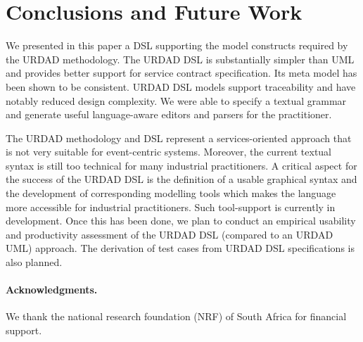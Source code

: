 \section{Conclusions and Future Work \label{sec:conclusionsAndOutlook}}

We presented in this paper a DSL supporting the model constructs required by the URDAD methodology. The URDAD DSL is substantially simpler than UML and provides better support for service contract specification. Its meta model has been shown to be consistent. URDAD DSL models support traceability and have notably reduced design complexity. We were able to specify a textual grammar and generate useful language-aware editors and parsers for the practitioner.

The URDAD methodology and DSL represent a services-oriented approach that is not very suitable for event-centric systems. Moreover, the current textual syntax is still too technical for many industrial practitioners. A critical aspect for the success of the URDAD DSL is the definition of a usable graphical syntax and the development of corresponding modelling tools which makes the language more accessible for industrial practitioners. Such tool-support is currently in development. Once this has been done, we plan to conduct an empirical usability and productivity assessment of the URDAD DSL (compared to an URDAD UML) approach. The derivation of test cases from URDAD DSL specifications is also planned.

\paragraph{Acknowledgments.} We thank the national research 
foundation (NRF) of South Africa for financial support.

